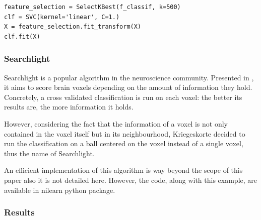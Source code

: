 \documentclass{frontiersSCNS} %
\begin{document}
\begin{lstlisting}
feature_selection = SelectKBest(f_classif, k=500)
clf = SVC(kernel='linear', C=1.)
X = feature_selection.fit_transform(X)
clf.fit(X)
\end{lstlisting}




\subsubsection{Searchlight}
\label{searchlight}

Searchlight is a popular algorithm in the neuroscience community.
Presented in \cite{kriegeskorte2006}, it aims to score
brain voxels depending on the amount of information they hold. Concretely, a
cross validated classification is run on each voxel: the better its results are,
the more information it holds.

However, considering the fact that the information of a voxel is not only
contained in the voxel itself but in its neighbourhood, Kriegeskorte decided to run
the classification on a ball centered on the voxel instead of a single voxel,
thus the name of Searchlight.

An efficient implementation of this algorithm is way beyond the scope of this
paper also it is not detailed here. However, the code, along with this example,
are available in nilearn python package.

\subsubsection{Results}
\end{document}
